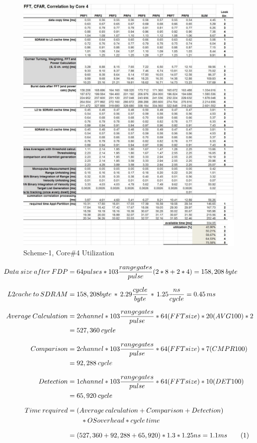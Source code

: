 \begin{figure}[h!]
	\centering
	\includegraphics[width=150mm]{figures/aa_scheme1_cpu_util_4}
	\caption{Scheme-1, Core\#4 Utilization}
	\label{fig:existing_analysis:aa_scheme1_cpu_util4}
\end{figure}

\begin{align*}
	\label{aa:scheme1:core4:equ2}
		Data \: size \: after \: FDP &=  64pulses * 103 \frac{range gates}{pulse} ( 2 * 8 + 2 * 4) = 158,208 \: byte\\[0.25cm] 
		L2cache \: to \: SDRAM &= 158,208 byte \, * \, 2.29\frac{cycle}{byte} \, * \, 1.25\frac{ns}{cycle} = 0.45 \, ms \\[0.25cm]
		Average \: Calculation &= 2channel * 103 \frac{range gates}{pulse} * 64(FFTsize) * 20(AVG100) * 2 \\
		&=  527,360 \: cycle \\[0.25cm]
		Comparison &= 2channel * 103 \frac{range gates}{pulse} * 64(FFTsize) * 7(CMPR100) \\
		&= 92,288 \: cycle \\[0.25cm]
		Detection &= 1channel * 103 \frac{range gates}{pulse} * 64(FFTsize) * 10(DET100) \\
		&= 65,920 \: cycle \\[0.25cm]
		Time \: required &= (Average \, calculation + Comparison + Detection) \\
		& \qquad * OSoverhead * cycle \, time \\[0.25cm]
		&= (527,360 + 92,288 + 65,920) * 1.3 * 1.25ns = 1.1ms \stepcounter{equation}\tag{\theequation} 
\end{align*}

